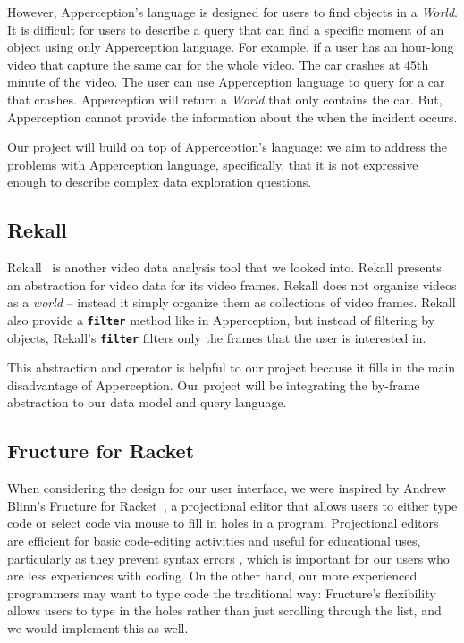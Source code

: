 However, Apperception's language is designed for users to find objects in a \emph{World}.
It is difficult for users to describe a query that can find a specific moment of an object using only Apperception language.
For example, if a user has an hour-long video that capture the same car for the whole video.
The car crashes at 45th minute of the video.
The user can use Apperception language to query for a car that crashes.
Apperception will return a \emph{World} that only contains the car.
But, Apperception cannot provide the information about the when the incident occurs.

Our project will build on top of Apperception's language: we aim to address the problems with Apperception language, specifically, that it is not expressive enough to describe complex data exploration questions.

\subsection{Rekall}
Rekall~\cite{fu:rekall} is another video data analysis tool that we looked into.
Rekall presents an abstraction for video data for its video frames.
Rekall does not organize videos as a \emph{world} --
instead it simply organize them as collections of video frames.
Rekall also provide a \textbf{\texttt{filter}} method like in Apperception, 
but instead of filtering by objects, Rekall's \textbf{\texttt{filter}} filters only the frames that the user is interested in.

This abstraction and operator is helpful to our project because it fills in the main disadvantage of Apperception.
Our project will be integrating the by-frame abstraction to our data model and query language.


\subsection{Fructure for Racket}
When considering the design for our user interface, we were inspired by Andrew Blinn's Fructure for Racket~\cite{blinn:fructure}, a projectional editor that allows users to either type code or select code via mouse to fill in holes in a program.
Projectional editors are efficient for basic code-editing activities \cite{berger:projection} and useful for educational uses, particularly as they prevent syntax errors \cite{santos:javardise, weintrop:block-based}, which is important for our users who are less experiences with coding.
On the other hand, our more experienced programmers may want to type code the traditional way: Fructure's flexibility allows users to type in the holes rather than just scrolling through the list, and we would implement this as well.

